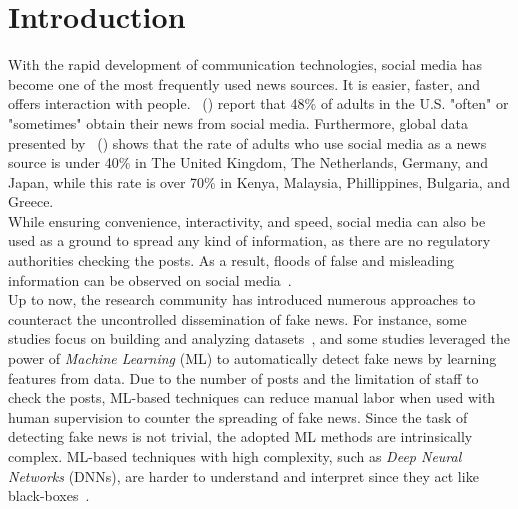 
\chapter{Introduction}\label{chapter:introduction}

With the rapid development of communication technologies, social media has become one of the most frequently used news sources. It is easier, faster, and offers interaction with people.~\citeauthor{NewsConsumptionAcrossSocialMedia_pewresearch} (\citeyear{NewsConsumptionAcrossSocialMedia_pewresearch}) report that 48\% of adults in the U.S. "often" or "sometimes" obtain their news from social media. Furthermore, global data presented by~\citeauthor{StatistaUsageOfSocialMedia_Watson} (\citeyear{StatistaUsageOfSocialMedia_Watson}) shows that the rate of adults who use social media as a news source is under 40\% in The United Kingdom, The Netherlands, Germany, and Japan, while this rate is over 70\% in Kenya, Malaysia, Phillippines, Bulgaria, and Greece.\\
While ensuring convenience, interactivity, and speed, social media can also be used as a ground to spread any kind
of information, as there are no regulatory authorities checking the posts. As a result, floods of false and misleading information can be observed on social media~\parencite{SocialMediaAndFakeNewsIn2016Election_Allcott}.\\
Up to now, the research community has introduced numerous approaches to counteract the uncontrolled dissemination of fake news. For instance, some studies focus on building and analyzing datasets~\parencite{FakeNewsDetectionOnSocialMediaADataMiningPerspective_Shu, LiarLiarPantsOnFire_Wang, FakeReddit_Nakamura, SomeLikeItHoaxDataset_Tacchini, BuzzfaceDataset_Santia, UPFD_Dataset_Shu}, and some studies leveraged the power of \emph{Machine Learning} (ML) to automatically detect fake news by learning features from data. Due to the number of posts and the limitation of staff to check the posts, ML-based techniques can reduce manual labor when used with human supervision to counter the spreading of fake news. Since the task of detecting fake news is not trivial, the adopted ML methods are intrinsically complex. ML-based techniques with high complexity, such as \emph{Deep Neural Networks} (DNNs), are harder to understand and interpret since they act like black-boxes~\parencite{CanWeOpenTheBlackBoxOfAI_Castelvecchi}.\\
